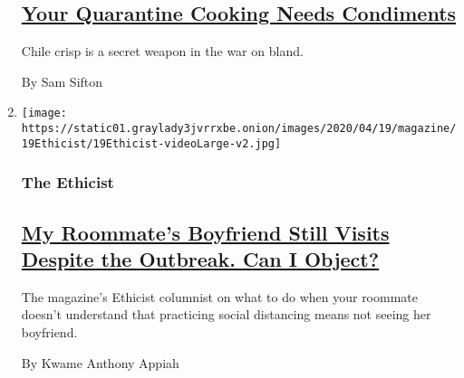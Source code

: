 \begin{enumerate}
{  \subsection{\texorpdfstring{\href{/2020/04/13/magazine/chile-crisp-tofu-green-bean-recipe.html}{Your
  Quarantine Cooking Needs
  Condiments}}{Your Quarantine Cooking Needs Condiments}}\label{your-quarantine-cooking-needs-condiments}}

  Chile crisp is a secret weapon in the war on bland.

  By Sam Sifton
\item
  \texttt{[image: https://static01.graylady3jvrrxbe.onion/images/2020/04/19/magazine/19Ethicist/19Ethicist-videoLarge-v2.jpg]}

  \hypertarget{the-ethicist}{%
  \subsubsection{The Ethicist}\label{the-ethicist}}

  \hypertarget{my-roommates-boyfriend-still-visits-despite-the-outbreak-can-i-object}{%
  \subsection{\texorpdfstring{\href{/2020/04/14/magazine/sheltering-at-home-roommate-social-distancing-coronavrius.html}{My
  Roommate's Boyfriend Still Visits Despite the Outbreak. Can I
  Object?}}{My Roommate's Boyfriend Still Visits Despite the Outbreak. Can I Object?}}\label{my-roommates-boyfriend-still-visits-despite-the-outbreak-can-i-object}}

  The magazine's Ethicist columnist on what to do when your roommate
  doesn't understand that practicing social distancing means not seeing
  her boyfriend.

  By Kwame Anthony Appiah
\end{enumerate}

